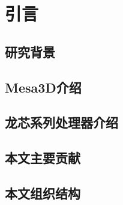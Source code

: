 

\chapter{引言}
\label{cha:intro}
  
\section{研究背景}


\section{Mesa3D介绍}


\section{龙芯系列处理器介绍}


\section{本文主要贡献}


\section{本文组织结构}

